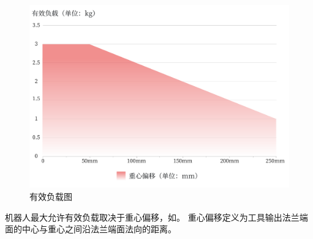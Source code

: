 \begin{figure}[htb!]
	\centering
	\includegraphics[width=\textwidth]{line_graphs/effective_payload.pdf}
	\caption{有效负载图}
	\label{fig:有效负载图}
\end{figure}

机器人最大允许有效负载取决于重心偏移，如。
重心偏移定义为工具输出法兰端面的中心与重心之间沿法兰端面法向的距离。

